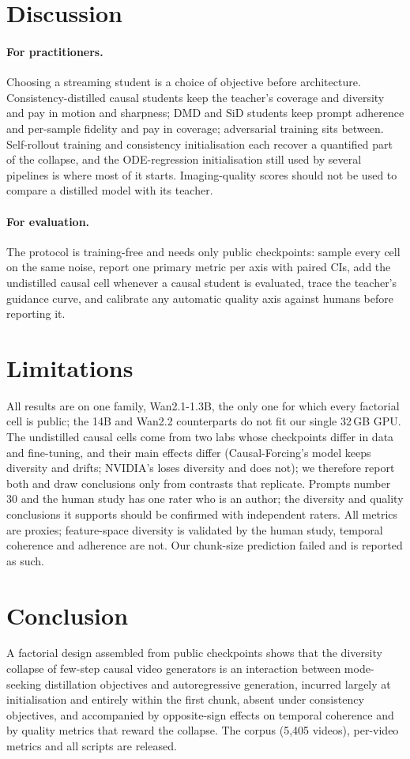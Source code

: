 \documentclass[10pt,twocolumn,letterpaper]{article}
\begin{document}
\section{Discussion}
\paragraph{For practitioners.} Choosing a streaming student is a choice of objective before architecture. Consistency-distilled causal students keep the teacher's coverage and diversity and pay in motion and sharpness; DMD and SiD students keep prompt adherence and per-sample fidelity and pay in coverage; adversarial training sits between. Self-rollout training and consistency initialisation each recover a quantified part of the collapse, and the ODE-regression initialisation still used by several pipelines is where most of it starts. Imaging-quality scores should not be used to compare a distilled model with its teacher.
\paragraph{For evaluation.} The protocol is training-free and needs only public checkpoints: sample every cell on the same noise, report one primary metric per axis with paired CIs, add the undistilled causal cell whenever a causal student is evaluated, trace the teacher's guidance curve, and calibrate any automatic quality axis against humans before reporting it.

\section{Limitations}
All results are on one family, Wan2.1-1.3B, the only one for which every factorial cell is public; the 14B and Wan2.2 counterparts do not fit our single 32\,GB GPU. The undistilled causal cells come from two labs whose checkpoints differ in data and fine-tuning, and their main effects differ (Causal-Forcing's model keeps diversity and drifts; NVIDIA's loses diversity and does not); we therefore report both and draw conclusions only from contrasts that replicate. Prompts number 30 and the human study has one rater who is an author; the diversity and quality conclusions it supports should be confirmed with independent raters. All metrics are proxies; feature-space diversity is validated by the human study, temporal coherence and adherence are not. Our chunk-size prediction failed and is reported as such.

\section{Conclusion}
A factorial design assembled from public checkpoints shows that the diversity collapse of few-step causal video generators is an interaction between mode-seeking distillation objectives and autoregressive generation, incurred largely at initialisation and entirely within the first chunk, absent under consistency objectives, and accompanied by opposite-sign effects on temporal coherence and by quality metrics that reward the collapse. The corpus (5{,}405 videos), per-video metrics and all scripts are released.

{\small}
\end{document}
